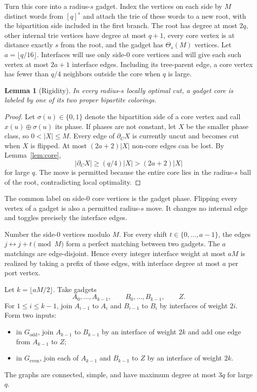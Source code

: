 \documentclass[11pt]{article}
\newtheorem{lemma}[theorem]{Lemma}
\theoremstyle{definition}
\theoremstyle{remark}
\begin{document}
Turn this core into a radius-$s$ gadget.  Index the vertices on each side by $M$
distinct words from $[q]^s$ and attach the trie of these words to a new root, with
the bipartition side included in the first branch.  The root has degree at most
$2q$, other internal trie vertices have degree at most $q+1$, every core vertex is
at distance exactly $s$ from the root, and the gadget has $\Theta_s(M)$ vertices.
Let $a=\lfloor q/16\rfloor$.  Interfaces will use only side-$0$ core vertices and
will give each such vertex at most $2a+1$ interface edges.  Including its tree-parent
edge, a core vertex has fewer than $q/4$ neighbors outside the core when $q$ is large.

\begin{lemma}[Rigidity]\label{lem:rigidity}
In every radius-$s$ locally optimal cut, a gadget core is labeled by one of its two
proper bipartite colorings.
\end{lemma}

\begin{proof}
Let $\sigma(u)\in\{0,1\}$ denote the bipartition side of a core vertex and call
$x(u)\oplus\sigma(u)$ its phase.  If phases are not constant, let $X$ be the smaller
phase class, so $0<|X|\leq M$.  Every edge of $\partial_CX$ is currently uncut and
becomes cut when $X$ is flipped.  At most $(2a+2)|X|$ non-core edges can be lost.
By Lemma~\ref{lem:core},
\[
 |\partial_CX|\geq(q/4)|X|>(2a+2)|X|
\]
for large $q$.  The move is permitted because the entire core lies in the
radius-$s$ ball of the root, contradicting local optimality.
\end{proof}

The common label on side-$0$ core vertices is the gadget phase.  Flipping every
vertex of a gadget is also a permitted radius-$s$ move.  It changes no internal edge
and toggles precisely the interface edges.

Number the side-$0$ vertices modulo $M$.  For every shift
$t\in\{0,\ldots,a-1\}$, the edges $j\leftrightarrow j+t\pmod M$ form a perfect
matching between two gadgets.  The $a$ matchings are edge-disjoint.  Hence every
integer interface weight at most $aM$ is realized by taking a prefix of these edges,
with interface degree at most $a$ per port vertex.

Let $k=\lfloor aM/2\rfloor$.  Take gadgets
\[
 A_0,\ldots,A_{k-1},
 \qquad B_0,\ldots,B_{k-1},
 \qquad Z.
\]
For $1\leq i\leq k-1$, join $A_{i-1}$ to $A_i$ and $B_{i-1}$ to $B_i$ by
interfaces of weight $2i$.  Form two inputs:
\begin{itemize}
  \item in $G_{\mathrm{odd}}$, join $A_{k-1}$ to $B_{k-1}$ by an interface of
  weight $2k$ and add one edge from $A_{k-1}$ to $Z$;
  \item in $G_{\mathrm{even}}$, join each of $A_{k-1}$ and $B_{k-1}$ to $Z$ by
  an interface of weight $2k$.
\end{itemize}
The graphs are connected, simple, and have maximum degree at most $3q$ for large
$q$.
\end{document}
